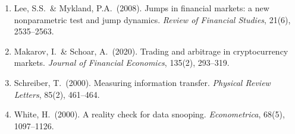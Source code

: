 \documentclass[11pt,a4paper]{article}
\theoremstyle{definition}
\theoremstyle{plain}
\begin{document}
\begin{enumerate}
  \item Lee, S.S.\ \& Mykland, P.A.\ (2008). Jumps in financial markets: a new nonparametric test
        and jump dynamics. \textit{Review of Financial Studies}, 21(6), 2535--2563.

  \item Makarov, I.\ \& Schoar, A.\ (2020). Trading and arbitrage in cryptocurrency markets.
        \textit{Journal of Financial Economics}, 135(2), 293--319.

  \item Schreiber, T.\ (2000). Measuring information transfer. \textit{Physical Review Letters},
        85(2), 461--464.

  \item White, H.\ (2000). A reality check for data snooping. \textit{Econometrica}, 68(5),
        1097--1126.
\end{enumerate}
\end{document}

